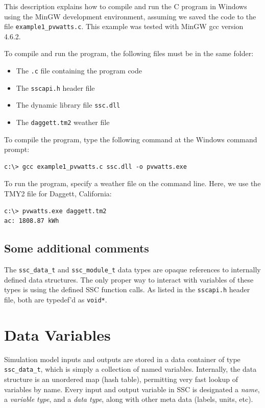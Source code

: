 \documentclass{scrartcl} %
\begin{document}
This description explains how to compile and run the C program in Windows using the  MinGW development environment, assuming we saved the code to the file \texttt{example1\_pvwatts.c}. This example was tested with MinGW gcc version 4.6.2.

To compile and run the program, the following files must be in the same folder:

\begin{itemize}
\item The \texttt{.c} file containing the program code
\item The \texttt{sscapi.h} header file
\item The dynamic library file \texttt{ssc.dll}
\item The \texttt{daggett.tm2} weather file
\end{itemize}

To compile the program, type the following command at the Windows command prompt:

\begin{verbatim}
c:\> gcc example1_pvwatts.c ssc.dll -o pvwatts.exe
\end{verbatim}

To run the program, specify a weather file on the command line. Here, we use the TMY2 file for Daggett, California:

\begin{verbatim}
c:\> pvwatts.exe daggett.tm2
ac: 1808.87 kWh
\end{verbatim}

\subsection{Some additional comments}

The \texttt{ssc\_data\_t} and \texttt{ssc\_module\_t} data types are opaque references to internally defined data structures.  The only proper way to interact with variables of these types is using the defined SSC function calls.  As listed in the \texttt{sscapi.h} header file, both are typedef'd as \texttt{void*}.


\section{Data Variables}
\label{sec_variables}

Simulation model inputs and outputs are stored in a data container of type \texttt{ssc\_data\_t}, which is simply a collection of named variables.  Internally, the data structure is an unordered map (hash table), permitting very fast lookup of variables by name.  Every input and output variable in SSC is designated a \emph{name}, a \emph{variable type}, and a \emph{data type}, along with other meta data (labels, units, etc). 
\end{document}
